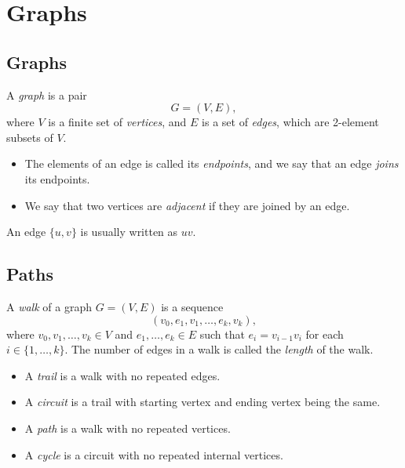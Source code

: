 \chapter{Graphs}
\section{Graphs}
\begin{definition}
  A \emph{graph} is a pair
  \begin{equation*}
    G = (V, E),
  \end{equation*}
  where $V$ is a finite set of \emph{vertices}, and $E$ is a set of
  \emph{edges}, which are 2-element subsets of $V$.
  \begin{itemize}
    \item The elements of an edge is called its \emph{endpoints}, and we say
    that an edge \emph{joins} its endpoints.
    \item We say that two vertices are \emph{adjacent} if they are joined by an
    edge.
  \end{itemize}
\end{definition}
\begin{remark}
  An edge $\{u, v\}$ is usually written as $uv$.
\end{remark}

\section{Paths}
\begin{definition}
  A \emph{walk} of a graph $G = (V, E)$ is a sequence
  \begin{equation*}
    (v_0, e_1, v_1, \dots, e_k, v_k),
  \end{equation*}
  where $v_0, v_1, \dots, v_k \in V$ and $e_1, \dots, e_k \in E$ such that
  $e_i = v_{i-1}v_i$ for each $i \in \{1, \dots, k\}$.
  The number of edges in a walk is called the \emph{length} of the walk.
  \begin{itemize}
    \item A \emph{trail} is a walk with no repeated edges.
    \item A \emph{circuit} is a trail with starting vertex and ending vertex
    being the same.
    \item A \emph{path} is a walk with no repeated vertices.
    \item A \emph{cycle} is a circuit with no repeated internal vertices.
  \end{itemize}
\end{definition}

